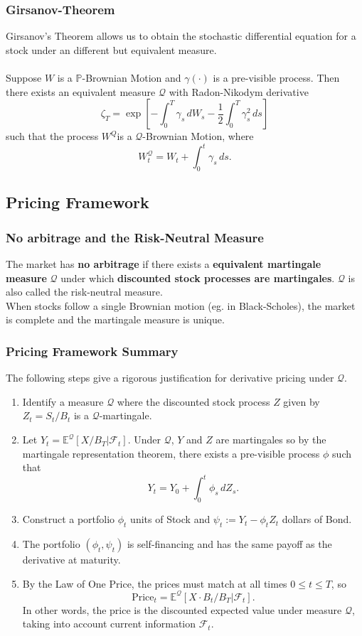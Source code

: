 \documentclass[11pt]{article}
\newcommand{\E}{\mathbb{E}}
\newcommand{\F}{\mathcal{F}}
\newcommand{\PR}{\mathbb{P}}
\newcommand{\Q}{\mathcal{Q}}
\begin{document}
	\subsubsection{Girsanov-Theorem}
	Girsanov's Theorem allows us to obtain the stochastic differential equation for a stock under an different but equivalent measure.\\\\
	Suppose \( W \) is a \( \PR \)-Brownian Motion and \( \gamma(\cdot) \) is a pre-visible process. Then there exists an equivalent measure \( \Q \) with Radon-Nikodym derivative 
	\[	\zeta_T = \exp\left[-\int_{0}^{T}\gamma_s\, dW_s - \frac{1}{2}\int_{0}^{T}\gamma_s^2 \, ds\right]
		\]
	such that the process \( W^{Q} \)is a \( \Q \)-Brownian Motion, where
	\[	W^{\Q}_t = W_t + \int_{0}^{t} \gamma_s\, ds.\]
	\subsection{Pricing Framework}
	\subsubsection{No arbitrage and the Risk-Neutral Measure}
	The market has \textbf{no arbitrage} if there exists a \textbf{equivalent martingale measure} \( \Q \) under which \textbf{discounted stock processes are martingales}. \( \Q \) is also called the risk-neutral measure. \\
	When stocks follow a single Brownian motion (eg. in Black-Scholes), the market is complete and the martingale measure is unique.
	\subsubsection{Pricing Framework Summary}
	The following steps give a rigorous justification for derivative pricing under \( \Q \).
	\begin{enumerate}
		\item Identify a measure \( \Q \) where the discounted stock process \( Z \) given by \( Z_t = S_t/B_t \) is a \( \Q \)-martingale.
		\item Let \( Y_t = \E^{\Q}\left[X/B_T|\mathcal{F}_t\right] \). Under \( \Q \), \( Y \) and \( Z \) are martingales so by the martingale representation theorem, there exists a pre-visible process \( \phi \) such that
		\[	Y_t = Y_0 + \int_{0}^{t}\phi_s\, dZ_s.
		   \]
		\item Construct a portfolio \( \phi_t \) units of Stock and \( \psi_t := Y_t - \phi_t Z_t \) dollars of Bond.
		\item The portfolio \( (\phi_t, \psi_t) \) is self-financing and has the same payoff as the derivative at maturity.
		\item By the Law of One Price, the prices must match at all times \( 0\leq t\leq T \), so
		\[	\text{Price}_t = \E^{\Q}[X \cdot B_t/B_T|\F_t].
			\]
		 In other words, the price is the discounted expected value under measure \( \Q \), taking into account current information \( \F_t \).
	\end{enumerate}
\end{document}

